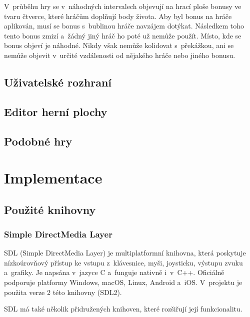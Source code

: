 V~průběhu hry se v~náhodných intervalech objevují na hrací ploše bonusy ve tvaru čtverce, které hráčům doplňují body života. Aby byl bonus na hráče aplikován, musí se bonus s~bublinou hráče navzájem dotýkat. Následkem toho tento bonus zmizí a~žádný jiný hráč ho poté už nemůže použít. Místo, kde se bonus objeví je náhodné. Nikdy však nemůže kolidovat s~překážkou, ani se nemůže objevit v~určité vzdálenosti od nějakého hráče nebo jiného bonusu.

\section{Uživatelské rozhraní}


\section{Editor herní plochy}

\section{Podobné hry}


\chapter{Implementace}

\section{Použité knihovny}

\subsection*{Simple DirectMedia Layer}

SDL (Simple DirectMedia Layer) je multiplatformní knihovna, která poskytuje nízkoúrovňový přístup ke vstupu z~klávesnice, myši, joysticku, výstupu zvuku a~grafiky. Je napsána v~jazyce C a~funguje nativně i~v~C++. Oficiálně podporuje platformy Windows, macOS, Linux, Android a~iOS. V~projektu je použita verze 2 této knihovny (SDL2).

SDL má také několik přidružených knihoven, které rozšiřují její funkcionalitu. 

